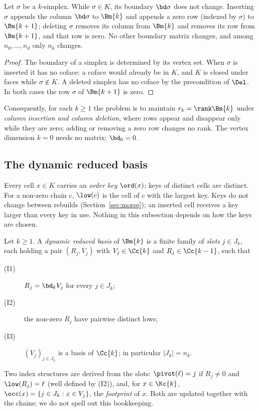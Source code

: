 \begin{observation}\label{obs:structural}
Let $\sigma$ be a $k$-simplex. While $\sigma\in K$, its boundary $\bd\sigma$ does
not change. Inserting $\sigma$ appends the column $\bd\sigma$ to $\Bm{k}$ and
appends a zero row (indexed by $\sigma$) to $\Bm{k+1}$; deleting $\sigma$
removes its column from $\Bm{k}$ and removes its row from $\Bm{k+1}$, and that
row is zero. No other boundary matrix changes, and among $n_0,\dots,n_d$ only
$n_k$ changes.
\end{observation}

\begin{proof}
The boundary of a simplex is determined by its vertex set. When $\sigma$ is
inserted it has no coface: a coface would already be in $K$, and $K$ is closed
under faces while $\sigma\notin K$. A deleted simplex has no coface by the
precondition of $\Del$. In both cases the row $\sigma$ of $\Bm{k+1}$ is zero.
\end{proof}

Consequently, for each $k\ge1$ the problem is to maintain $r_k=\rank\Bm{k}$ under
\emph{column insertion and column deletion}, where rows appear and disappear
only while they are zero; adding or removing a zero row changes no rank. The
vertex dimension $k=0$ needs no matrix: $\bd_0=0$.

\subsection{The dynamic reduced basis}\label{sec:drb}

Every cell $x\in K$ carries an \emph{order key} $\ord(x)$; keys of distinct cells
are distinct. For a non-zero chain $c$, $\low(c)$ is the cell of $c$ with the
largest key. Keys do not change between rebuilds (Section~\ref{sec:morse}); an
inserted cell receives a key larger than every key in use. Nothing in this
subsection depends on how the keys are chosen.

\begin{definition}[DRB]\label{def:drb}
Let $k\ge1$. A \emph{dynamic reduced basis} of $\Bm{k}$ is a finite family of
\emph{slots} $j\in J_k$, each holding a pair $(R_j,V_j)$ with $V_j\in\Cc{k}$
and $R_j\in\Cc{k-1}$, such that
\begin{description}
\item[(I1)] $R_j=\bd_k V_j$ for every $j\in J_k$;
\item[(I2)] the non-zero $R_j$ have pairwise distinct lows;
\item[(I3)] $(V_j)_{j\in J_k}$ is a basis of $\Cc{k}$; in particular $|J_k|=n_k$.
\end{description}
Two index structures are derived from the slots: $\pivot(\ell)=j$ if $R_j\ne0$
and $\low(R_j)=\ell$ (well defined by (I2)), and, for $x\in\Kc{k}$,
$\occ(x)=\{j\in J_k : x\in V_j\}$, the \emph{footprint} of $x$. Both are updated
together with the chains; we do not spell out this bookkeeping.
\end{definition}

